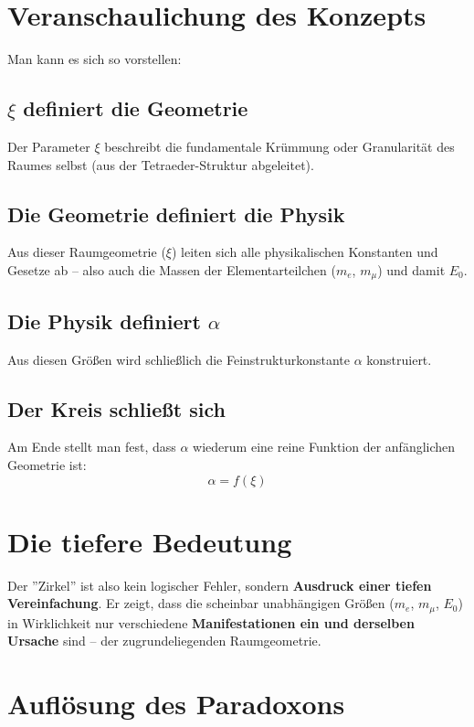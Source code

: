 \documentclass[12pt, a4paper]{article}
\begin{document}
\section*{Veranschaulichung des Konzepts}

Man kann es sich so vorstellen:

\subsection*{$\xi$ definiert die Geometrie}
Der Parameter $\xi$ beschreibt die fundamentale Krümmung oder Granularität des Raumes selbst (aus der Tetraeder-Struktur abgeleitet).

\subsection*{Die Geometrie definiert die Physik}
Aus dieser Raumgeometrie ($\xi$) leiten sich alle physikalischen Konstanten und Gesetze ab – also auch die Massen der Elementarteilchen ($m_e$, $m_\mu$) und damit $E_0$.

\subsection*{Die Physik definiert $\alpha$}
Aus diesen Größen wird schließlich die Feinstrukturkonstante $\alpha$ konstruiert.

\subsection*{Der Kreis schließt sich}
Am Ende stellt man fest, dass $\alpha$ wiederum eine reine Funktion der anfänglichen Geometrie ist:
\[
\alpha = f(\xi)
\]

\section*{Die tiefere Bedeutung}

Der ''Zirkel'' ist also kein logischer Fehler, sondern \textbf{Ausdruck einer tiefen Vereinfachung}. Er zeigt, dass die scheinbar unabhängigen Größen ($m_e$, $m_\mu$, $E_0$) in Wirklichkeit nur verschiedene \textbf{Manifestationen ein und derselben Ursache} sind – der zugrundeliegenden Raumgeometrie.

\section*{Auflösung des Paradoxons}
\end{document}
